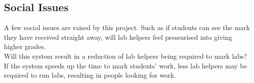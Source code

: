 \documentclass[12pt]{article}  %
\begin{document}
\subsection{Social Issues}
A few social issues are raised by this project. Such as if students can see the mark they have received straight away, will lab helpers feel pressurised into giving higher grades.\\
Will this system result in a reduction of lab helpers being required to mark labs? If the system speeds up the time to mark students’ work, less lab helpers may be required to run labs, resulting in people looking for work.







\newpage
\printbibliography[heading=bibintoc]
\end{document}

